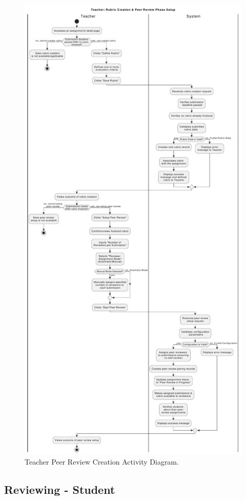 \vspace*{\fill}
\begin{figure}[h]
    \centering
    \includegraphics[width=.7\linewidth]{SRS/imgs/4_TeacherPeerCreation.pdf}
    \caption{Teacher Peer Review Creation Activity Diagram.}
    \label{fig:TeacherPeerReviewCreationAD}
\end{figure}
\vspace*{\fill}
\clearpage

\subsection{Reviewing - Student}
    

